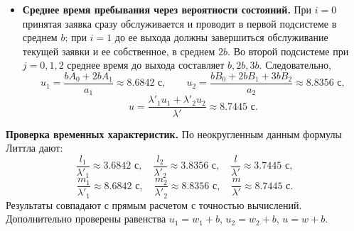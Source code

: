 \documentclass[a4paper,12pt]{article}
\begin{document}
\begin{itemize}
        \item \textbf{Среднее время пребывания через вероятности состояний.}
        При $i=0$ принятая заявка сразу обслуживается и проводит в первой
        подсистеме в среднем $b$; при $i=1$ до ее выхода должны завершиться
        обслуживание текущей заявки и ее собственное, в среднем $2b$.
        Во второй подсистеме при $j=0,1,2$ среднее время до выхода составляет
        $b,2b,3b$. Следовательно,
        \[
            u_1=\frac{bA_0+2bA_1}{a_1}\approx8.6842\text{ с},
            \qquad
            u_2=\frac{bB_0+2bB_1+3bB_2}{a_2}\approx8.8356\text{ с},
        \]
        \[
            u=\frac{\lambda'_1u_1+\lambda'_2u_2}{\lambda'}
            \approx8.7445\text{ с}.
        \]
    \end{itemize}

    \textbf{Проверка временных характеристик.}
    По неокругленным данным формулы Литтла дают:
    \[
        \frac{l_1}{\lambda'_1}\approx3.6842\text{ с},\quad
        \frac{l_2}{\lambda'_2}\approx3.8356\text{ с},\quad
        \frac{l}{\lambda'}\approx3.7445\text{ с},
    \]
    \[
        \frac{m_1}{\lambda'_1}\approx8.6842\text{ с},\quad
        \frac{m_2}{\lambda'_2}\approx8.8356\text{ с},\quad
        \frac{m}{\lambda'}\approx8.7445\text{ с}.
    \]
    Результаты совпадают с прямым расчетом с точностью вычислений.
    Дополнительно проверены равенства $u_1=w_1+b$, $u_2=w_2+b$, $u=w+b$.
\end{document}
